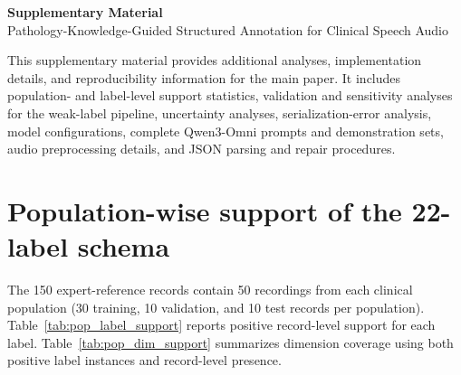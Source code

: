 \documentclass[10pt]{article}
\begin{document}
\begin{center}
{\Large\bfseries Supplementary Material}\\[4pt]
{\large Pathology-Knowledge-Guided Structured Annotation for Clinical Speech Audio}
\end{center}

This supplementary material provides additional analyses, implementation details, and reproducibility information for the main paper. It includes population- and label-level support statistics, validation and sensitivity analyses for the weak-label pipeline, uncertainty analyses, serialization-error analysis, model configurations, complete Qwen3-Omni prompts and demonstration sets, audio preprocessing details, and JSON parsing and repair procedures.

\section{Population-wise support of the 22-label schema}
The 150 expert-reference records contain 50 recordings from each clinical population (30 training, 10 validation, and 10 test records per population). Table~\ref{tab:pop_label_support} reports positive record-level support for each label. Table~\ref{tab:pop_dim_support} summarizes dimension coverage using both positive label instances and record-level presence.
\end{document}
